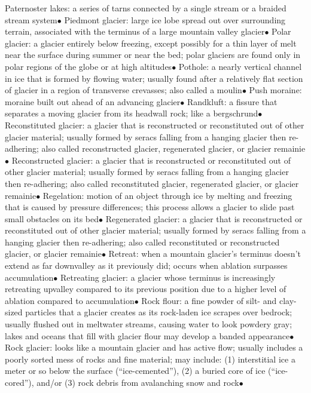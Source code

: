 \documentclass{article}
\newcommand{\ddd}{$\bullet$}
\begin{document}
\begin{multicols*}{4}
        Paternoster lakes: a series of tarns connected by a single stream or a braided stream system\ddd
        Piedmont glacier: large ice lobe spread out over surrounding terrain, associated with the terminus of a large mountain valley glacier\ddd
        Polar glacier: a glacier entirely below freezing, except possibly for a thin layer of melt near the surface during summer or near the bed; polar glaciers are found only in polar regions of the globe or at high altitudes\ddd
        Pothole: a nearly vertical channel in ice that is formed by flowing water; usually found after a relatively flat section of glacier in a region of transverse crevasses; also called a moulin\ddd
        Push moraine: moraine built out ahead of an advancing glacier\ddd
        Randkluft: a fissure that separates a moving glacier from its headwall rock; like a bergschrund\ddd
        Reconstituted glacier: a glacier that is reconstructed or reconstituted out of other glacier material; usually formed by seracs falling from a hanging glacier then re-adhering; also called reconstructed glacier, regenerated glacier, or glacier remainie\ddd
        Reconstructed glacier: a glacier that is reconstructed or reconstituted out of other glacier material; usually formed by seracs falling from a hanging glacier then re-adhering; also called reconstituted glacier, regenerated glacier, or glacier remainie\ddd
        Regelation: motion of an object through ice by melting and freezing that is caused by pressure differences; this process allows a glacier to slide past small obstacles on its bed\ddd
        Regenerated glacier: a glacier that is reconstructed or reconstituted out of other glacier material; usually formed by seracs falling from a hanging glacier then re-adhering; also called reconstituted or reconstructed glacier, or glacier remainie\ddd
        Retreat: when a mountain glacier's terminus doesn't extend as far downvalley as it previously did; occurs when ablation surpasses accumulation\ddd
        Retreating glacier: a glacier whose terminus is increasingly retreating upvalley compared to its previous position due to a higher level of ablation compared to accumulation\ddd
        Rock flour: a fine powder of silt- and clay-sized particles that a glacier creates as its rock-laden ice scrapes over bedrock; usually flushed out in meltwater streams, causing water to look powdery gray; lakes and oceans that fill with glacier flour may develop a banded appearance\ddd
        Rock glacier: looks like a mountain glacier and has active flow; usually includes a poorly sorted mess of rocks and fine material; may include: (1) interstitial ice a meter or so below the surface (“ice-cemented”), (2) a buried core of ice (“ice-cored”), and/or (3) rock debris from avalanching snow and rock\ddd

\end{multicols*}
\end{document}
